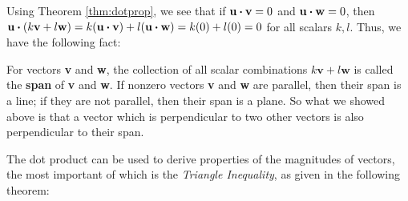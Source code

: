 Using Theorem \ref{thm:dotprop}, we see that if $\textbf{u} \bm{\cdot} \textbf{v} = 0$ and
$\textbf{u} \bm{\cdot} \textbf{w} = 0$, then $\textbf{u} \bm{\cdot} (k\textbf{v} + l\textbf{w}) =
k(\textbf{u} \bm{\cdot} \textbf{v}) + l(\textbf{u} \bm{\cdot} \textbf{w}) = k(0) + l(0) =0$ for all scalars $k, l$.
Thus, we have the following fact:\vspace{2mm}

\vspace{2mm}
For vectors \textbf{v} and \textbf{w}, the collection of all scalar combinations $k\textbf{v} + l\textbf{w}$
is called the \textbf{span} of \textbf{v} and \textbf{w}. If nonzero vectors \textbf{v} and \textbf{w} are
parallel, then their span is a line; if they are not parallel, then their span is a plane. So what we showed above is
that a vector which is perpendicular to two other vectors is also perpendicular to their span.

The dot product can be used to derive properties of the magnitudes of vectors, the most important of which is the
\emph{Triangle Inequality}, as given in the following theorem:

